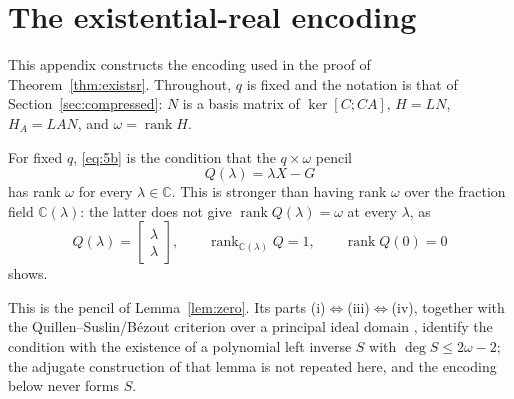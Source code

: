 \documentclass[journal]{IEEEtran}
\theoremstyle{plainn}
\theoremstyle{remark}
\begin{document}
\appendices
\section{The existential-real encoding}\label{app:encoding}

This appendix constructs the encoding used in the proof of Theorem~\ref{thm:existsr}. Throughout, $q$ is fixed and the notation is that of Section~\ref{sec:compressed}: $N$ is a basis matrix of $\ker[C;CA]$, $H=LN$, $H_A=LAN$, and $\omega=\operatorname{rank}H$.

For fixed $q$, \eqref{eq:5b} is the condition that the $q\times\omega$ pencil
\begin{equation}
Q(\lambda)=\lambda X-G
\end{equation}
has rank $\omega$ for every $\lambda\in\mathbb C$. This is stronger than having rank $\omega$ over the fraction field $\mathbb C(\lambda)$: the latter does not give $\operatorname{rank}Q(\lambda)=\omega$ at every $\lambda$, as
\begin{equation*}
Q(\lambda)=\begin{bmatrix}\lambda\\ \lambda\end{bmatrix},\qquad
\operatorname{rank}_{\mathbb C(\lambda)}Q=1,\qquad \operatorname{rank}Q(0)=0
\end{equation*}
shows.

This is the pencil of Lemma~\ref{lem:zero}. Its parts (i)$\Leftrightarrow$(iii)$\Leftrightarrow$(iv), together
with the Quillen--Suslin/B\'ezout criterion over a principal ideal domain \cite{fab90,lan02}, identify the
condition with the existence of a polynomial left inverse $S$ with $\deg S\le2\omega-2$; the adjugate
construction of that lemma is not repeated here, and the encoding below never forms $S$.
\end{document}

